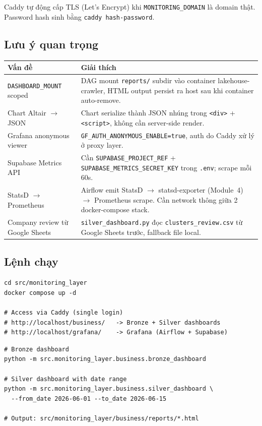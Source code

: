 Caddy tự động cấp TLS (Let's Encrypt) khi \texttt{MONITORING\_DOMAIN} là domain
thật. Password hash sinh bằng \texttt{caddy hash-password}.

\subsection{Lưu ý quan trọng}
\label{subsec:gotchas}

\begin{longtable}{p{5cm} p{9cm}}
\toprule
\textbf{Vấn đề} & \textbf{Giải thích} \\
\midrule
\endhead
\texttt{DASHBOARD\_MOUNT} scoped & DAG mount \texttt{reports/} subdir vào container lakehouse-crawler, HTML output persist ra host sau khi container auto-remove. \\
Chart Altair $\to$ JSON & Chart serialize thành JSON nhúng trong \texttt{<div>} + \texttt{<script>}, không cần server-side render. \\
Grafana anonymous viewer & \texttt{GF\_AUTH\_ANONYMOUS\_ENABLE=true}, auth do Caddy xử lý ở proxy layer. \\
Supabase Metrics API & Cần \texttt{SUPABASE\_PROJECT\_REF} + \texttt{SUPABASE\_METRICS\_SECRET\_KEY} trong \texttt{.env}; scrape mỗi 60s. \\
StatsD $\to$ Prometheus & Airflow emit StatsD $\to$ statsd-exporter (Module~4) $\to$ Prometheus scrape. Cần network thông giữa 2 docker-compose stack. \\
Company review từ Google Sheets & \texttt{silver\_dashboard.py} đọc \texttt{clusters\_review.csv} từ Google Sheets trước, fallback file local. \\
\bottomrule
\end{longtable}

\subsection{Lệnh chạy}
\label{subsec:commands}

\begin{lstlisting}[style=bashstyle, caption={Khởi động monitoring stack}]
cd src/monitoring_layer
docker compose up -d

# Access via Caddy (single login)
# http://localhost/business/   -> Bronze + Silver dashboards
# http://localhost/grafana/    -> Grafana (Airflow + Supabase)
\end{lstlisting}

\begin{lstlisting}[style=bashstyle, caption={Chạy business dashboard thủ công}]
# Bronze dashboard
python -m src.monitoring_layer.business.bronze_dashboard

# Silver dashboard with date range
python -m src.monitoring_layer.business.silver_dashboard \
  --from_date 2026-06-01 --to_date 2026-06-15

# Output: src/monitoring_layer/business/reports/*.html
\end{lstlisting}
